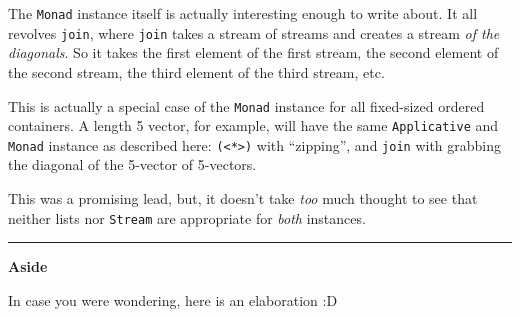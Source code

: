 \documentclass[]{article}
\begin{document}
The \texttt{Monad} instance itself is actually interesting enough to write
about. It all revolves \texttt{join}, where \texttt{join} takes a stream of
streams and creates a stream \emph{of the diagonals}. So it takes the first
element of the first stream, the second element of the second stream, the third
element of the third stream, etc.

This is actually a special case of the \texttt{Monad} instance for all
fixed-sized ordered containers. A length 5 vector, for example, will have the
same \texttt{Applicative} and \texttt{Monad} instance as described here:
\texttt{(\textless{}*\textgreater{})} with ``zipping'', and \texttt{join} with
grabbing the diagonal of the 5-vector of 5-vectors.

This was a promising lead, but, it doesn't take \emph{too} much thought to see
that neither lists nor \texttt{Stream} are appropriate for \emph{both}
instances.

\begin{center}\rule{0.5\linewidth}{\linethickness}\end{center}

\textbf{Aside}

In case you were wondering, here is an elaboration :D
\end{document}
